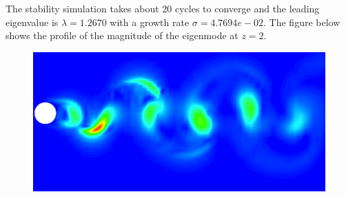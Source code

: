 The stability simulation takes about 20 cycles to converge and the leading eigenvalue is $\lambda=1.2670$ with a growth rate $\sigma=4.7694e-02$. The figure below shows the profile of the magnitude of the eigenmode at $z=2$.

\begin{figure}[!htbp]
\centering
 {\includegraphics[width=1 \textwidth]{Figures/floquet}}
   \caption {}
\end{figure}

